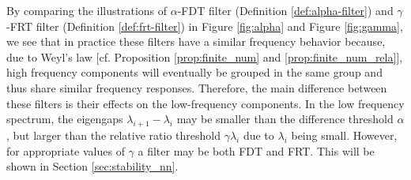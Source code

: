 \begin{remark}
\normalfont
\label{rem:filters}
By comparing the illustrations of $\alpha$-FDT filter (Definition \ref{def:alpha-filter}) and $\gamma$-FRT filter (Definition \ref{def:frt-filter}) in Figure \ref{fig:alpha} and Figure \ref{fig:gamma}, we see that in practice these filters have a similar frequency behavior because, due to Weyl's law [cf. Proposition \ref{prop:finite_num} and \ref{prop:finite_num_rela}], high frequency components will eventually be grouped in the same group and thus share similar frequency responses. Therefore, the main difference between these filters is their effects on the low-frequency components. In the low frequency spectrum, the eigengaps $\lambda_{i+1}-\lambda_i$ may be smaller than the difference threshold $\alpha$, but larger than the relative ratio threshold $\gamma \lambda_i$ due to $\lambda_i$ being small. However, for appropriate values of $\gamma$ a filter may be both FDT and FRT. This will be shown in Section \ref{sec:stability_nn}.
\end{remark}



